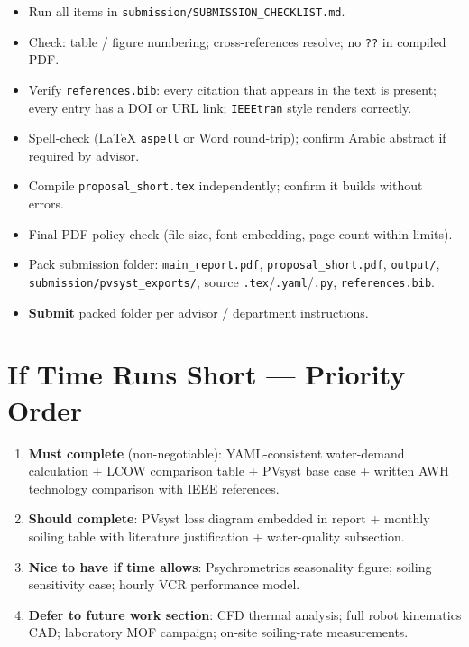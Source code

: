 \documentclass[11pt,a4paper]{article}
\begin{document}
\begin{description}[style=nextline,leftmargin=2cm,font=\normalfont\bfseries]
  \item[Day~13 \textnormal{(Tue 5 May)}]
  \begin{itemize}[nosep]
    \item Run all items in \texttt{submission/SUBMISSION\_CHECKLIST.md}.
    \item Check: table / figure numbering; cross-references resolve; no \texttt{??} in compiled PDF.
    \item Verify \texttt{references.bib}: every citation that appears in the text is present; every entry has a DOI or URL link; \texttt{IEEEtran} style renders correctly.
    \item Spell-check (LaTeX \texttt{aspell} or Word round-trip); confirm Arabic abstract if required by advisor.
    \item Compile \texttt{proposal\_short.tex} independently; confirm it builds without errors.
  \end{itemize}

  \item[Day~14 \textnormal{(Wed 6 May --- Final Submission)}]
  \begin{itemize}[nosep]
    \item Final PDF policy check (file size, font embedding, page count within limits).
    \item Pack submission folder: \texttt{main\_report.pdf}, \texttt{proposal\_short.pdf}, \texttt{output/}, \texttt{submission/pvsyst\_exports/}, source \texttt{.tex}/\texttt{.yaml}/\texttt{.py}, \texttt{references.bib}.
    \item \textbf{Submit} packed folder per advisor / department instructions.
  \end{itemize}
\end{description}

\section{If Time Runs Short --- Priority Order}
\begin{enumerate}[leftmargin=*]
  \item \textbf{Must complete} (non-negotiable):
    YAML-consistent water-demand calculation + LCOW comparison table + PVsyst base case + written AWH technology comparison with IEEE references.
  \item \textbf{Should complete}:
    PVsyst loss diagram embedded in report + monthly soiling table with literature justification + water-quality subsection.
  \item \textbf{Nice to have if time allows}:
    Psychrometrics seasonality figure; soiling sensitivity case; hourly VCR performance model.
  \item \textbf{Defer to future work section}:
    CFD thermal analysis; full robot kinematics CAD; laboratory MOF campaign; on-site soiling-rate measurements.
\end{enumerate}
\end{document}
